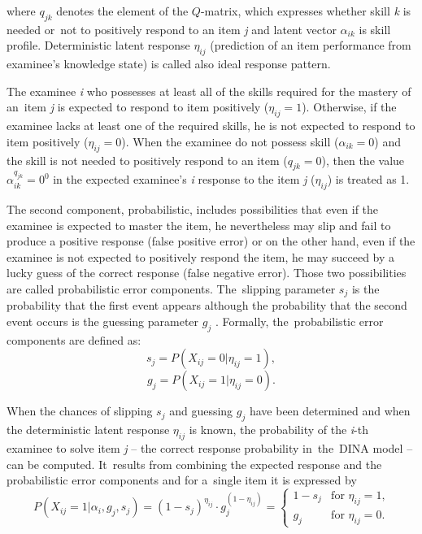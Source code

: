 \documentclass[english]{pwr_wmat_praca_dyplomowa}
\theoremstyle{plain}
\numberwithin{theorem}{chapter}
\theoremstyle{definition}
\numberwithin{theorem}{chapter}
\begin{document}
	\noindent where $q_{jk}$ denotes the element of the $Q$-matrix, which expresses whether skill \textit{k} is needed or~not to positively respond to an item \textit{j} and latent vector $\alpha_{ik}$ is skill profile. Deterministic latent response $\eta_{ij}$ (prediction of an item performance from examinee's knowledge state) is called also ideal response pattern. %
	
	The examinee \textit{i} who possesses at least all of the skills required for the mastery of an~item \textit{j} is expected to respond to item positively ($\eta_{ij} = 1$). Otherwise, if the examinee lacks at least one of the required skills, he is not expected to respond to item positively ($\eta_{ij} = 0$). When the examinee do not possess skill ($\alpha_{ik} = 0$) and the skill is not needed to positively respond to an item ($q_{jk} = 0$), then the value $\alpha_{ik}^{q_{jk}} = 0^0$ in the expected examinee's \textit{i} response to the item \textit{j} ($\eta_{ij}$) is treated as 1.
	
	The second component, probabilistic, includes possibilities that even if the examinee is expected to master the item, he nevertheless may slip and fail to produce a positive response (false positive error) or on the other hand, even if the examinee is not expected to positively respond the item, he may succeed by a lucky guess of the correct response (false negative error). Those two possibilities are called probabilistic error components. The~slipping parameter $s_j$ is the probability that the first event appears although the probability that the second event occurs is the guessing parameter $g_j$ \cite{de_la_torre_2011}. Formally, the~probabilistic error components are defined as: 
	\begin{equation}
	s_j = P(X_{ij} = 0 | \eta_{ij} = 1),
	\end{equation}
	\begin{equation}
	g_j = P(X_{ij} = 1 | \eta_{ij} = 0).
	\end{equation}
	
	When the chances of slipping $s_j$ and guessing $g_j$ have been determined and when the deterministic latent response $\eta_{ij}$ is known, the probability of the \textit{i}-th examinee to solve item \textit{j} -- the correct response probability in~the~DINA model -- can be computed. It~results from combining the expected response and the probabilistic error components and for a~single item it is expressed by
	\begin{equation}
	P(X_{ij} = 1 | \alpha_i, g_j, s_j) = (1-s_j)^{\eta_{ij}} \cdot g_j^{(1-\eta_{ij})} = \left\{ \begin{array}{ll}
	1 - s_j & \textrm{for $\eta_{ij} = 1$,} \\
	g_j & \textrm{for $\eta_{ij} = 0$.} 
	\end{array}\right.
	\end{equation}
	
\end{document}

